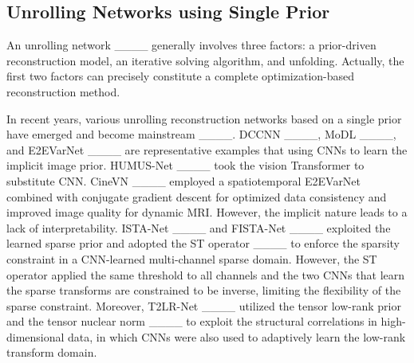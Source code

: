 \subsection{Unrolling Networks using Single Prior}
An unrolling network ____ generally involves three factors: a prior-driven reconstruction model, an iterative solving algorithm, and unfolding. Actually, the first two factors can precisely constitute a complete optimization-based reconstruction method. 


In recent years, various unrolling reconstruction networks based on a single prior have emerged and become mainstream ____. DCCNN ____, MoDL ____, and E2EVarNet ____ are representative examples that using CNNs to learn the implicit image prior. HUMUS-Net ____ took the vision Transformer to substitute CNN. 
CineVN ____ employed a spatiotemporal E2EVarNet combined with conjugate gradient descent for optimized data consistency and improved image quality for dynamic MRI.
However, the implicit nature leads to a lack of interpretability. ISTA-Net ____ and FISTA-Net ____ exploited the learned sparse prior and adopted the ST operator ____ to enforce the sparsity constraint in a CNN-learned multi-channel sparse domain. However, the ST operator applied the same threshold to all channels and the two CNNs that learn the sparse transforms are constrained to be inverse, limiting the flexibility of the sparse constraint. 
Moreover, T2LR-Net ____ utilized the tensor low-rank prior and the tensor nuclear norm ____ to exploit the structural correlations in high-dimensional data, in which CNNs were also used to adaptively learn the low-rank transform domain. %

